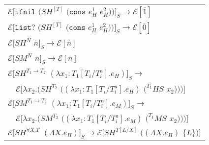 \begin{figure}[p]
\centering
\begin{tabular}{l}
\vspace{5pt}

$\mathscr{E}[\mathtt{ifnil}$ $(SH^{[T]}$ $(\mathtt{cons}$ $e_{H}^{1}$ $e_{H}^{2}))]_{S}\rightarrow\mathscr{E}[\overline{1}]$ \\

\vspace{5pt}

$\mathscr{E}[\mathtt{list?}$ $(SH^{[T]}$ $(\mathtt{cons}$ $e_{H}^{1}$ $e_{H}^{2}))]_{S}\rightarrow\mathscr{E}[\overline{0}]$ \\

\vspace{5pt}

$\mathscr{E}[SH^{N}$ $\overline{n}]_{S}\rightarrow\mathscr{E}[\overline{n}]$ \\

\vspace{5pt}

$\mathscr{E}[SM^{N}$ $\overline{n}]_{S}\rightarrow\mathscr{E}[\overline{n}]$ \\

\vspace{5pt}

$\mathscr{E}[SH^{T_{1}\rightarrow T_{2}}$ $(\lambda x_{1}:T_{1}[T_{i}/T_{i}^{a}].e_{H})]_{S}\rightarrow$ \\

\vspace{5pt}

$\quad\mathscr{E}[\lambda x_{2}.(SH^{T_{2}}$ $((\lambda x_{1}:T_{1}[T_{i}/T_{i}^{a}].e_{H})$ $(^{T_{1}}HS$ $x_{2})))]$ \\

\vspace{5pt}

$\mathscr{E}[SM^{T_{1}\rightarrow T_{2}}$ $(\lambda x_{1}:T_{1}[T_{i}/T_{i}^{a}].e_{M})]_{S}\rightarrow$ \\

\vspace{5pt}

$\quad\mathscr{E}[\lambda x_{2}.(SM^{T_{2}}$ $((\lambda x_{1}:T_{1}[T_{i}/T_{i}^{a}].e_{M})$ $(^{T_{1}}MS$ $x_{2})))]$ \\

\vspace{5pt}

$\mathscr{E}[SH^{\forall X.T}$ $(\Lambda X.e_{H})]_{S}\rightarrow\mathscr{E}[SH^{T[L/X]}$ $((\Lambda X.e_{H})$ $\lbrace L\rbrace)]$ \\


\end{tabular}
\end{figure}
